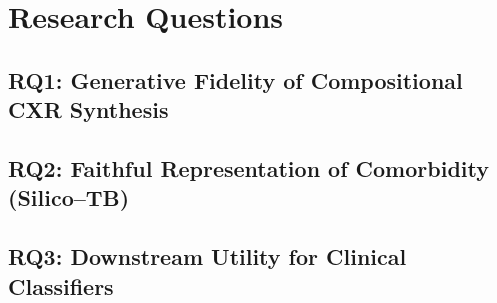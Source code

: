 \section{Research Questions}

\subsection{RQ1: Generative Fidelity of Compositional CXR Synthesis}
\label{subsec:rq1}

\subsection{RQ2: Faithful Representation of Comorbidity (Silico--TB)}
\label{subsec:rq2}

\subsection{RQ3: Downstream Utility for Clinical Classifiers}
\label{subsec:rq3}
